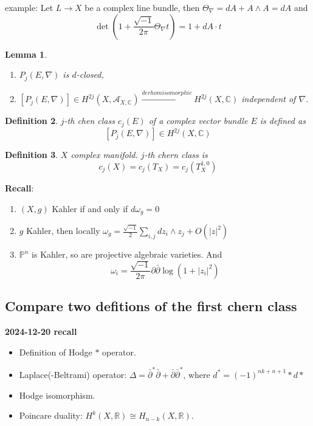 \documentclass{article}
\newtheorem{definition}{Definition}[subsection]
\newtheorem{lemma}[definition]{Lemma}
\begin{document}
example: Let $L\to X$ be a complex line bundle, then $ \Theta_{\nabla}=dA + A\wedge A=dA $ and 
\[
  \det(1+ \frac{\sqrt{-1}}{2\pi}\Theta_{\nabla}t)=1+dA \cdot t
\]
\begin{lemma}
  \begin{enumerate}
    \item $ P_{j}(E,\nabla) $ is $d$-closed,  
    \item $ [P_{j}(E,\nabla)] \in H^{2j}(X,\mathcal{A}_{X,\mathbb{C}}^{\cdot}) \xrightarrow{de rhom isomorphic} H^{2j}(X,\mathbb{C}) $ independent of $ \nabla $.
  \end{enumerate}
\end{lemma}
\begin{definition}
  $j$-th chen class $ c_{j}(E) $ of a complex vector bundle $E$ is defined as
  \[
    [P_{j}(E,\nabla)] \in H^{2j}(X,\mathbb{C})
  \]
\end{definition}
\begin{definition}
  $X$ complex manifold. $j$-th chern class is
  \[
    c_{j}(X)=c_{j}(T_{X})=c_{j}(T^{1,0}_{X})
  \]
\end{definition}

\textbf{Recall}:

\begin{enumerate}
  \item $ (X,g) $ Kahler   if and only if $ d\omega_{g}=0 $     
  \item $g$ Kahler, then locally $ \omega_{g}= \frac{\sqrt{-1}}{2}\sum_{i,j}dz_{i}\wedge z_{j}+ O(|z|^{2}) $  
  \item $\mathbb{P}^{n}$ is Kahler, so are projective algebraic varieties. And
    \[
      \omega_{i}=\frac{\sqrt{-1}}{2\pi}\partial\bar{\partial}\log(1+|z_{i}|^{2})
    \]
\end{enumerate}

\subsection{Compare two defitions of the first chern class}

\textbf{2024-12-20 recall }

\begin{itemize}
  \item Definition of Hodge $*$ operator.
  \item Laplace(-Beltrami) operator: $ \Delta = \bar{\partial}^{*}\bar{\partial}+\bar{\partial}\bar{\partial}^{*} $, where $ d^{*}=(-1)^{nk+n+1}*d* $
  \item Hodge isomorphism.
  \item Poincare duality: $ H^{k}(X,\mathbb{R})\cong H_{n-k}(X,\mathbb{R}) $.
\end{itemize}
\end{document}
